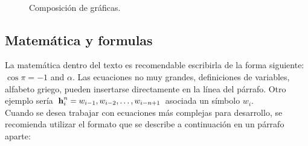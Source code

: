 \documentclass[
10pt,			%
letterpaper,	%
oneside,		%
headinclude, footinclude, %
BCOR5mm, 		%
]{scrartcl}
\begin{document}
\begin{figure}[tb]
	\centering
	 \quad
	\\
	 \quad
	\caption[Composición de gráficas.]{Composición de gráficas.} %
	\label{fig:fig08}
\end{figure}


\subsection{Matemática y formulas}

La matemática dentro del texto es recomendable escribirla de la forma siguiente: $\cos\pi=-1$ and $\alpha$. Las ecuaciones no muy grandes, definiciones de variables, alfabeto griego, pueden insertarse directamente en la línea del párrafo. Otro ejemplo sería $\textrm{{\textbf{h}}}_i^n = w_{i - 1} ,w_{i - 2}, \ldots,w_{i - n + 1}$ asociada un símbolo $w_i$.\\
Cuando se desea trabajar con ecuaciones más complejas para desarrollo, se recomienda utilizar el formato que se describe a continuación en un párrafo aparte:
\end{document}
